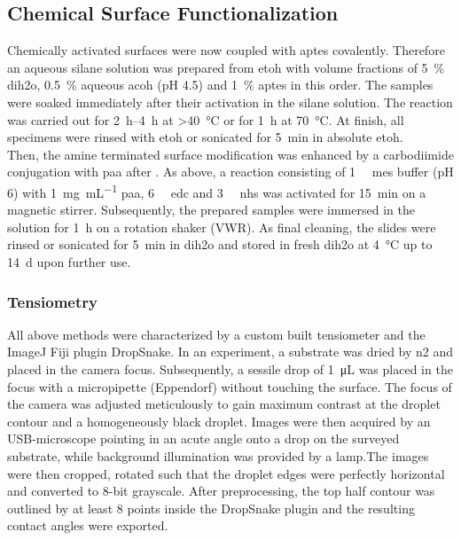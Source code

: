 \subsection{Chemical Surface Functionalization}
\label{sec:meth:surfFunc}
Chemically activated surfaces were now coupled with \gls{aptes} covalently. Therefore an aqueous silane solution was prepared from \gls{etoh} with volume fractions of \SI{5}{\percent} \gls{dih2o}, \SI{0.5}{\percent} aqueous \gls{acoh} (pH 4.5) and \SI{1}{\percent} \gls{aptes} in this order. The samples were soaked immediately after their activation in the silane solution. The reaction was carried out for \SIrange{2}{4}{\hour} at \SI{>40}{\degreeCelsius} or for \SI{1}{\hour} at \SI{70}{\degreeCelsius}. At finish, all specimens were rinsed with \gls{etoh} or sonicated for \SI{5}{\minute} in absolute \gls{etoh}.\\
Then, the amine terminated surface modification was enhanced by a carbodiimide conjugation with \gls{paa} after \citet{lit:Anti-EpCAM-PAA}. As above, a reaction consisting of \SI{1}{\milli\molar} \gls{mes} buffer (pH 6) with \SI{1}{\milli\gram\per\milli\liter} \gls{paa}, \SI{6}{\milli\molar} \gls{edc} and  \SI{3}{\milli\molar} \gls{nhs} was activated for \SI{15}{\minute} on a magnetic stirrer. Subsequently, the prepared samples were immersed in the solution for \SI{1}{\hour} on a rotation shaker (VWR). As final cleaning, the slides were rinsed or sonicated for \SI{5}{\minute} in \gls{dih2o} and stored in fresh \gls{dih2o} at \SI{4}{\degreeCelsius} up to \SI{14}{\day} upon further use.


\subsubsection{Tensiometry}
All above methods were characterized by a custom built tensiometer and the ImageJ Fiji plugin DropSnake. \cite{lit:chem:Fiji,lit:chem:surfaceTension}
In an experiment, a substrate was dried by \gls{n2} and placed in the camera focus. Subsequently, a sessile drop of \SI{1}{\micro\liter} was placed in the focus with a micropipette (Eppendorf) without touching the surface. The focus of the camera was adjusted meticulously to gain maximum contrast at the droplet contour and a homogeneously black droplet. Images were then acquired by an USB-microscope 
pointing in an acute angle onto a drop on the surveyed substrate, while background illumination was provided by a lamp.The images were then cropped, rotated such that the droplet edges were perfectly horizontal and converted to 8-bit grayscale. After preprocessing, the top half contour was outlined by at least 8 points inside the DropSnake plugin and the resulting contact angles were exported.

